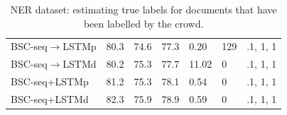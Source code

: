 \begin{table}
\begin{tabularx}{\textwidth}{| l | Y | Y | Y | Y | Y | >{\raggedleft\arraybackslash}p{1.6cm} |}
BSC-seq$\rightarrow$LSTMp & 80.3 & 74.6 & 77.3 & %
0.20 & 129 & .1, 1, 1 \\
BSC-seq$\rightarrow$LSTMd & 80.2 & 75.3 & 77.7 & %
11.02 & 0 & .1, 1, 1 \\
BSC-seq+LSTMp & 81.2 & 75.3 & 78.1 & %
0.54 & 0 & .1, 1, 1 \\
BSC-seq+LSTMd & 82.3 & 75.9 & 78.9 & %
0.59 & 0 & .1, 1, 1 \\
\hline
\end{tabularx}
\caption{NER dataset: estimating true labels for documents that have been labelled by the crowd.}
\label{tab:aggregation_results_ner}
\npnoround
\end{table}



